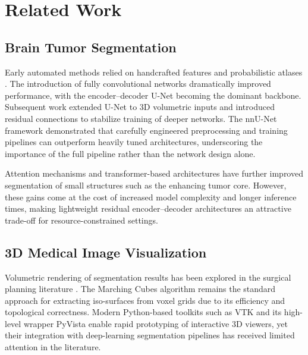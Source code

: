 \documentclass[conference]{IEEEtran}
\begin{document}
\section{Related Work}

\subsection{Brain Tumor Segmentation}

Early automated methods relied on handcrafted features and probabilistic
atlases \cite{brats2020menze}. The introduction of fully convolutional
networks dramatically improved performance, with the encoder--decoder U-Net
\cite{ronneberger2015} becoming the dominant backbone. Subsequent work
extended U-Net to 3D volumetric inputs \cite{cciccek20163d} and introduced
residual connections \cite{he2016deep} to stabilize training of deeper
networks. The nnU-Net framework \cite{isensee2021nnunet} demonstrated that
carefully engineered preprocessing and training pipelines can outperform
heavily tuned architectures, underscoring the importance of the full
pipeline rather than the network design alone.

Attention mechanisms \cite{oktay2018attention} and transformer-based
architectures \cite{hatamizadeh2022unetr} have further improved
segmentation of small structures such as the enhancing tumor core.
However, these gains come at the cost of increased model complexity and
longer inference times, making lightweight residual encoder--decoder
architectures an attractive trade-off for resource-constrained settings.

\subsection{3D Medical Image Visualization}

Volumetric rendering of segmentation results has been explored in the
surgical planning literature \cite{kikinis20143d}. The Marching Cubes
algorithm \cite{lorensen1987marching} remains the standard approach for
extracting iso-surfaces from voxel grids due to its efficiency and
topological correctness. Modern Python-based toolkits such as
VTK \cite{schroeder2004visualization} and its high-level wrapper
PyVista enable rapid prototyping of interactive 3D viewers, yet their
integration with deep-learning segmentation pipelines has received limited
attention in the literature.
\end{document}
